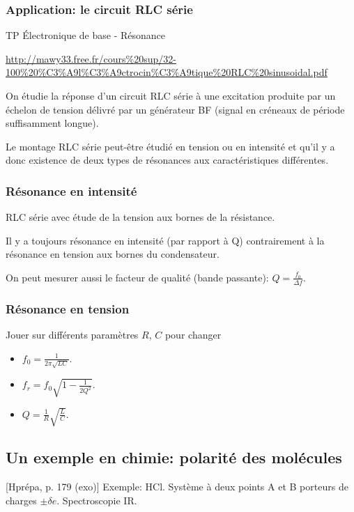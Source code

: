 \documentclass[11pt]{report}
\numberwithin{figure}{section}
\numberwithin{equation}{section}
\numberwithin{table}{section}
\newcommand{\1}{\boldsymbol{1}}
\begin{document}
\subsubsection{Application: le circuit RLC série}

\textcolor{mycolor5}{TP Électronique de base - Résonance}

\url{http://mawy33.free.fr/cours%20sup/32-100%20%C3%A9l%C3%A9ctrocin%C3%A9tique%20RLC%20sinusoidal.pdf}

On étudie la réponse d'un circuit RLC série à une excitation produite par un échelon de tension délivré par un générateur BF (signal en créneaux de période suffisamment longue).

Le montage RLC série peut-être étudié en tension ou en intensité et qu'il y a donc existence de deux types de résonances aux caractéristiques différentes.

\subsubsection{Résonance en intensité}

RLC série avec étude de la tension aux bornes de la résistance.

Il y a toujours résonance en intensité (par rapport à Q) contrairement à la résonance en tension aux bornes du condensateur.

On peut mesurer aussi le facteur de qualité (bande passante): $Q = \frac{f_0}{\Delta f}$.

\subsubsection{Résonance en tension}

Jouer sur différents paramètres $R$, $C$ pour changer
\begin{itemize}
\item $f_0 = \frac{1}{2\pi \sqrt{LC}}$.
\item $f_r = f_0 \sqrt{1 - \frac{1}{2Q^2}}$.
\item $Q = \frac{1}{R} \sqrt{\frac{L}{C}}$.
\end{itemize}

\subsection{Un exemple en chimie: polarité des molécules}

[Hprépa, p. 179 (exo)] Exemple: HCl. Système à deux points A et B porteurs de charges $\pm \delta e$. Spectroscopie IR.
\end{document}

